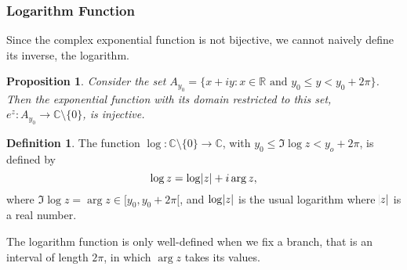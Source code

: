 \documentclass[12pt]{article}
\newcommand{\CC}{\mathbb{C}}
\newcommand{\RR}{\mathbb{R}}
\newtheorem{prop}{Proposition}[theorem]
\theoremstyle{definition}
\newtheorem{definition}{Definition}[section]
\begin{document}
\subsubsection{Logarithm Function}
Since the complex exponential function is not bijective, we cannot naively define its inverse, the logarithm. 
\begin{prop}
	Consider the set $A_{y_0} = \{ x + iy : x \in \RR \text{ and } y_0 \leq y < y_0 + 2 \pi \}$.
	Then the exponential function with its domain restricted to this set, $e^z : A_{y_0} \to \CC \setminus \{ 0 \}$, is injective.  
\end{prop}
\begin{definition}
	The function $\log : \CC \setminus \{ 0 \} \to \CC$, with $y_0 \leq \Im \log z < y_o + 2 \pi$, is defined by
	\[
		\log z = \log \abs z + i \arg z,
	\]
	where $\Im \log z = \arg z \in [y_0 , y_0 + 2 \pi[$, and $\log \abs z$ is the usual logarithm where $\abs z$ is a real number.	
\end{definition}
The logarithm function is only well-defined when we fix a branch, that is an interval of length $2\pi$, in which $\arg z$ takes its values. 
\end{document}
